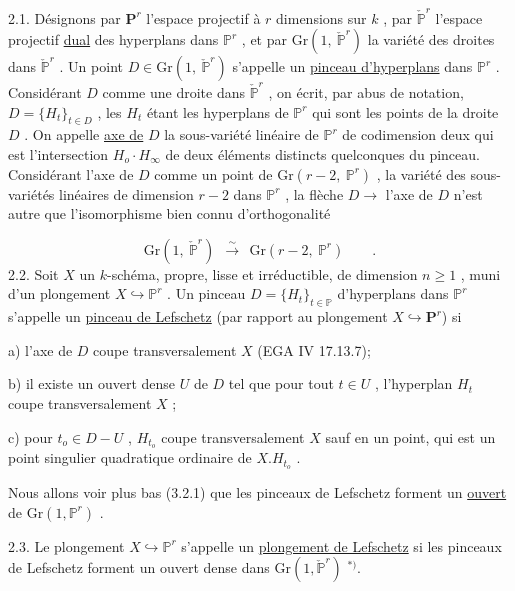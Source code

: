 2.1.    Désignons par $\mathbf{P}^r$ l'espace projectif à $r$ dimensions sur $k$ , par $\check{\mathbb{P}}^r$ l'espace projectif \underline{dual} des hyperplans dans $\mathbb{P}^r$ , et par $\mathrm{Gr}(1,\ \check{\mathbb{P}}^r)$ la variété des droites dans $\check{\mathbb{P}}^r$ . Un point $D \in \mathrm{Gr}(1,\ \check{\mathbb{P}}^r)$ s'appelle un \underline{pinceau d'hyperplans} dans $\mathbb{P}^r$ . Considérant $D$ comme une droite dans $\check{\mathbb{P}}^r$ , on écrit, par abus de notation, $D = \{H_t\}_{t \in D}$ , les $H_t$ étant les hyperplans de $\mathbb{P}^r$ qui sont les points de la droite $D$ . On appelle \underline{axe de} $D$ la sous-variété linéaire de $\mathbb{P}^r$ de codimension deux qui est l'intersection $H_o \cdot H_\infty$ de deux éléments distincts quelconques du pinceau. Considérant l'axe de $D$ comme un point de $\mathrm{Gr}(r-2,\ \mathbb{P}^r)$ , la variété des sous-variétés linéaires de dimension $r-2$ dans $\mathbb{P}^r$ , la flèche $D \longrightarrow$ l'axe de $D$ n'est autre que l'isomorphisme bien connu d'orthogonalité

\begin{equation*}
\mathrm{Gr}(1,\ \check{\mathbb{P}}^r) \ \ \stackrel{\textstyle\sim}{\longrightarrow} \ \ \mathrm{Gr}(r-2,\ \mathbb{P}^r) \qquad .
\end{equation*}
2.2.    Soit $X$ un $k$-schéma, propre, lisse et irréductible, de dimension $n \geq 1$ , muni d'un plongement $X \hookrightarrow \mathbb{P}^r$ . Un pinceau $D = \{H_t\}_{t \in \mathbb{P}}$ d'hyperplans dans $\mathbb{P}^r$ s'appelle un \underline{pinceau de Lefschetz}   (par rapport au plongement  $X \hookrightarrow \mathbf{P}^r$) si

a) l'axe de $D$ coupe transversalement $X$  (EGA IV 17.13.7);

b) il existe un ouvert dense $U$ de $D$ tel que pour tout $t \in U$ , l'hyperplan $H_t$ coupe transversalement $X$ ;

c) pour $t_o \in D-U$ , $H_{t_o}$ coupe transversalement $X$ sauf en
un point, qui est un point singulier quadratique ordinaire de  $X . H_{t_o}$  .

Nous allons voir plus bas (3.2.1) que les pinceaux de Lefschetz forment un  \underline{ouvert}  de  $\mathrm{Gr}(1, \mathbb{P}^r)$  .

2.3.    Le plongement  $X \hookrightarrow \mathbb{P}^r$  s'appelle un  \underline{plongement de Lefschetz} si les pinceaux de Lefschetz forment un ouvert dense dans $\mathrm{Gr}(1, \check{\mathbb{P}}^r)$ $^{*)}$.


